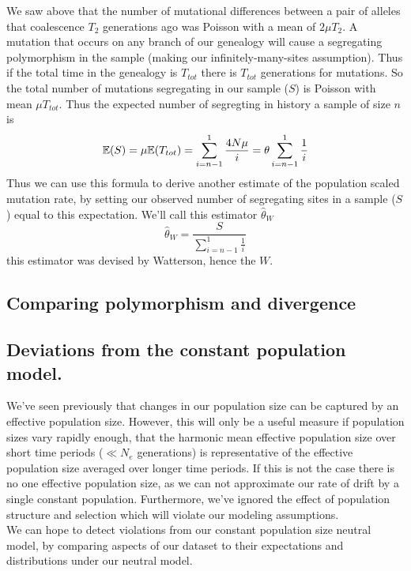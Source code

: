 We saw above that the number of mutational differences between a pair
of alleles that coalescence $T_2$ generations ago was Poisson with a
mean of $2 \mu T_2$. A mutation that occurs on any branch of our
genealogy will cause a segregating polymorphism in the sample
(making our infinitely-many-sites assumption). Thus if the total time
in the genealogy is $T_{tot}$ there is $T_{tot}$
generations for mutations. So the total number of mutations
segregating in our sample ($S$) is Poisson with mean $\mu T_{tot}$. Thus the
expected number of segregting  in history a sample of size $n$ is
\begin{equation}
\mathbb{E}(S) = \mu \mathbb{E}(T_{tot}) = \sum_{i=n-1}^1 \frac{4N\mu }{i} = \theta
\sum_{i=n-1}^1 \frac{1}{i}
\end{equation}
Thus we can use this formula to derive another estimate of the
population scaled mutation rate, by setting our observed number of
segregating sites in a sample ($S$) equal to this expectation. We'll call this estimator $\widehat{\theta}_W$
\begin{equation}
\widehat{\theta}_W =\frac{ S}{\sum_{i=n-1}^1 \frac{1}{i}}  
\end{equation}
this estimator was devised by Watterson, hence the $W$.


\subsection{Comparing polymorphism and divergence}


\subsection{Deviations from the constant population model.}
We've seen previously that changes in our population size can be
captured by an effective population size. However, this will only be a
useful measure if population sizes vary rapidly enough, that the
harmonic mean effective population size over short time periods ($\ll
N_e$ generations) is representative of the effective population size averaged over
longer time periods. If this is not the case there is no one effective
population size, as we can not approximate our rate of drift by a
single constant population. Furthermore, we've ignored the effect of
population structure and selection which will violate our modeling
assumptions. \\

We can hope to detect violations from our constant population size
neutral model, by comparing aspects of our dataset to their expectations
and distributions under our neutral model. \\

